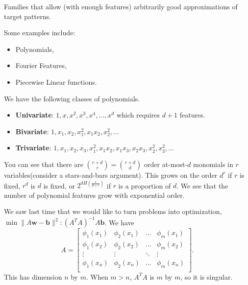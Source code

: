 \documentclass[11pt]{scrartcl}
\newcommand{\Vw}{\mathbf{w}}
\newcommand{\Vb}{\mathbf{b}}
\begin{document}
\begin{definition} Families that allow (with enough features) arbitrarily good approximations of target patterns.
\end{definition}
Some examples include:
\begin{itemize}
\item Polynomials,
\item Fourier Features,
\item Piecewise Linear functions.
\end{itemize}
\begin{example}  We have the following classes of polynomials.

\begin{itemize}
\item \textbf{Univariate}: $1, x, x^2, x^3, x^4, \dots, x^d$ which requires $d+1$ features.
\item \textbf{Bivariate}: $1, x_1, x_2, x_1^2, x_1x_2, x_2^2, \dots$
\item \textbf{Trivariate}: $1, x_1, x_2, x_3, x_1^2, x_1x_2, x_1x_3, x_2x_3, x_2^2, x_3^2, \dots$
\end{itemize}
You can see that there are $\binom{r+d}{r} =\binom{r+d}{d}$ order at-most-$d$ monomials in $r$ variables(consider a stars-and-bars argument).  This grows on the order $d^r$ if $r$ is fixed, $r^d$ is $d$ is fixed, or $2^{dH(\frac{r}{d+r})}$ if $r$ is a proportion of $d$.  We see that the number of polynomial features grow with exponential order.

We saw last time that we would like to turn problems into optimization, $\min \| A\Vw - \Vb\|^2 : (A^TA)^{-1}A\Vb$. We have 
$$A = \begin{bmatrix}
\phi_1(x_1) & \phi_2(x_1) & \dots & \phi_m(x_1) \\
\phi_1(x_2) & \phi_2(x_2) & \dots & \phi_m(x_2) \\
\vdots & \vdots & \ddots & \vdots \\
\phi_1(x_n) & \phi_2(x_n) & \dots & \phi_m(x_n) \\
\end{bmatrix}.$$
This has dimension $n$ by $m$.  When $m > n$, $A^TA$ is $m$ by $m$, so it is singular.
\end{example}
\end{document}
